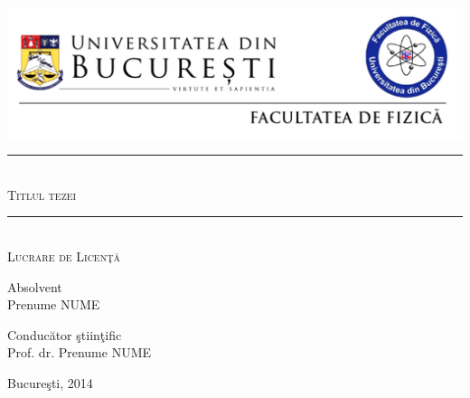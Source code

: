 \documentclass[12pt,openright,twoside]{book}
\newcommand{\HRule}{\rule{\linewidth}{0.4mm}}
\begin{document}
\begin{titlepage}
\begin{center}





\includegraphics[width=16cm]{./antet_L.jpg}



\vspace{4cm}



    \HRule \\[0.3cm]


    {\Large \textsc {Titlul tezei}}\\


  \HRule \\[1.1cm]

  \textsc{\large Lucrare de Licen\c{t}\u{a}}\\[4cm]

   \begin{flushleft} \large
    {Absolvent} \\[0.1cm]
    Prenume NUME
   \end{flushleft}

   \begin{flushright} \large
    {Conduc\u{a}tor \c{s}tiin\c{t}ific} \\[0.1cm]
    Prof. dr. Prenume NUME
   \end{flushright}


  \vfill


 {\large Bucure\c{s}ti, 2014}

\end{center}

\end{titlepage}
\newpage
\vspace*{\fill}
\thispagestyle{empty}




\newpage
\thispagestyle{plain} 


\vspace*{36pt}
\end{document}
